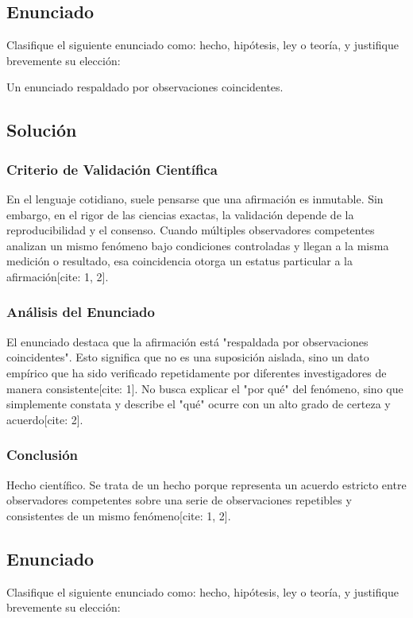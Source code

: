 \documentclass[12pt, a4paper]{article}
\begin{document}
\newpage

\subsection*{Enunciado}
Clasifique el siguiente enunciado como: hecho, hipótesis, ley o teoría, y justifique brevemente su elección: 

Un enunciado respaldado por observaciones coincidentes.

\subsection*{Solución}

\subsubsection*{Criterio de Validación Científica}
En el lenguaje cotidiano, suele pensarse que una afirmación es inmutable. Sin embargo, en el rigor de las ciencias exactas, la validación depende de la reproducibilidad y el consenso. Cuando múltiples observadores competentes analizan un mismo fenómeno bajo condiciones controladas y llegan a la misma medición o resultado, esa coincidencia otorga un estatus particular a la afirmación[cite: 1, 2].

\subsubsection*{Análisis del Enunciado}
El enunciado destaca que la afirmación está "respaldada por observaciones coincidentes". Esto significa que no es una suposición aislada, sino un dato empírico que ha sido verificado repetidamente por diferentes investigadores de manera consistente[cite: 1]. No busca explicar el "por qué" del fenómeno, sino que simplemente constata y describe el "qué" ocurre con un alto grado de certeza y acuerdo[cite: 2].

\subsubsection*{Conclusión}
Hecho científico. Se trata de un hecho porque representa un acuerdo estricto entre observadores competentes sobre una serie de observaciones repetibles y consistentes de un mismo fenómeno[cite: 1, 2].

\newpage

\subsection*{Enunciado}
Clasifique el siguiente enunciado como: hecho, hipótesis, ley o teoría, y justifique brevemente su elección: 
\end{document}

